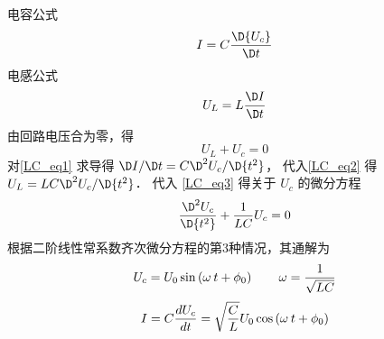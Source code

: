 
电容公式
\begin{equation}\label{LC_eq1}
I = C\frac{{\D {U_c}}}{{\D t}}
\end{equation}
电感公式
\begin{equation}\label{LC_eq2}
{U_L} = L\frac{{\D I}}{{\D t}}
\end{equation}
由回路电压合为零，得
\begin{equation}\label{LC_eq3}
{U_L} + {U_c} = 0
\end{equation}
对\autoref{LC_eq1} 求导得 ${\D I}/{\D t} = C{{{\D^2}{U_c}}}/{{\D{t^2}}}$， 代入\autoref{LC_eq2} 得 ${U_L} = LC {{{\D^2}{U_c}}}/{{\D{t^2}}}$． 代入  \autoref{LC_eq3}  得关于 ${U_c}$ 的微分方程
\begin{equation}
\frac{{{\D^2}{U_c}}}{{\D{t^2}}} + \frac{1}{{LC}}{U_c} = 0
\end{equation}
根据二阶线性常系数齐次微分方程的第3种情况，其通解为
\begin{equation}
{U_c} = {U_0}\sin \left( {\omega {\kern 1pt} {\kern 1pt} t + {\phi_0}} \right)
\qquad
\omega  = \frac{1}{{\sqrt {LC} }}
\end{equation}
\begin{equation}
I = C\frac{{d{U_c}}}{{dt}} = \sqrt {\frac{C}{L}} {U_0}\cos \left( {\omega {\kern 1pt} {\kern 1pt} t + {\phi_0}} \right)
\end{equation}
 
